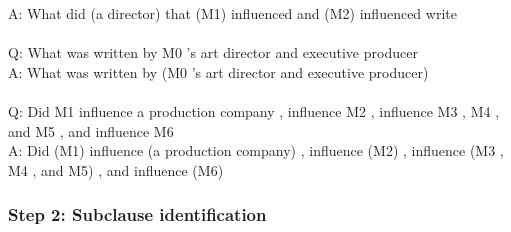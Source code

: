 \documentclass{article} \usepackage{iclr2022_conference,times}
\begin{document}
{A: What did (a director) that (M1) influenced and (M2) influenced write \\
 \\
Q: What was written by M0 's art director and executive producer \\
A: What was written by (M0 's art director and executive producer) \\
 \\
Q: Did M1 influence a production company , influence M2 , influence M3 , M4 , and M5 , and influence M6 \\
A: Did (M1) influence (a production company) , influence (M2) , influence (M3 , M4 , and M5) , and influence (M6)
}

\subsubsection{Step 2: Subclause identification}
\end{document}
